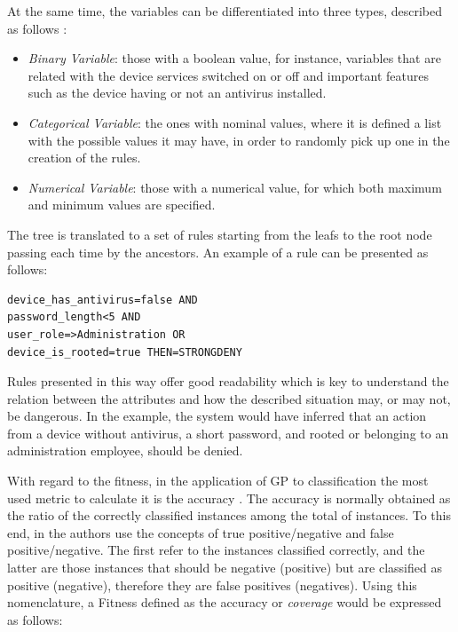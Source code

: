 \documentclass[a4paper,10pt,twocolumn,preprint,3p]{elsarticle}
\begin{document}
At the same time, the variables can be differentiated into three types, described as follows \cite{witten2005data}:

\begin{itemize}
\item {\em Binary Variable}: those with a boolean value, for instance, variables that are related with the device services switched on or off and important features such as the device having or not an antivirus installed.
\item {\em Categorical Variable}: the ones with nominal values, where it is defined a list with the possible values it may have, in order to randomly pick up one in the creation of the rules.
\item {\em Numerical Variable}: those with a numerical value, for which both maximum and minimum values are specified.

\end{itemize}

The tree is translated to a set of rules starting from the leafs to the root node passing each time by the ancestors. An example of a rule can be presented as follows:

\begin{verbatim}
device_has_antivirus=false AND
password_length<5 AND
user_role=>Administration OR
device_is_rooted=true THEN=STRONGDENY
\end{verbatim}

Rules presented in this way offer good readability which is key to understand the relation between the attributes and how the described situation may, or may not, be dangerous. In the example, the system would have inferred that an action from a device without antivirus, a short password, and rooted or belonging to an administration employee, should be denied.

With regard to the fitness, in the application of GP to classification
the most used metric to calculate it is the accuracy
\cite{espejo2010survey}. The accuracy is normally obtained as the
ratio of the correctly classified instances among the total of
instances. To this end, in \cite{witten2005data} the authors use the
concepts of true positive/negative and false positive/negative. The
first refer to the instances classified correctly, and the latter are
those instances that should be negative (positive) but are classified
as positive (negative), therefore they are false positives
(negatives). Using this nomenclature, a Fitness defined as the
accuracy or \textit{coverage} would be expressed as follows: 
\end{document}
